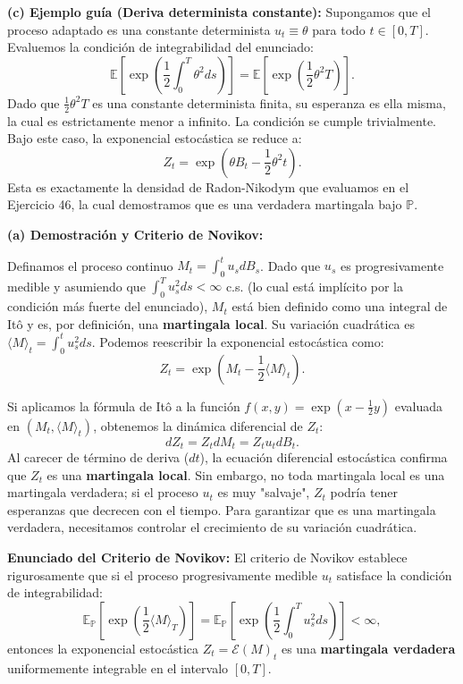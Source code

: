 \documentclass[11pt, letterpaper]{article}
\begin{document}
\begin{solucion}
    \textbf{(c) Ejemplo guía (Deriva determinista constante):}
    Supongamos que el proceso adaptado es una constante determinista $u_t \equiv \theta$ para todo $t \in [0, T]$. 
    Evaluemos la condición de integrabilidad del enunciado:
    \[ \mathbb{E}\left[\exp\left(\frac{1}{2}\int_0^T \theta^2 ds\right)\right] = \mathbb{E}\left[\exp\left(\frac{1}{2}\theta^2 T\right)\right]. \]
    Dado que $\frac{1}{2}\theta^2 T$ es una constante determinista finita, su esperanza es ella misma, la cual es estrictamente menor a infinito. La condición se cumple trivialmente.
    Bajo este caso, la exponencial estocástica se reduce a:
    \[ Z_t = \exp\left( \theta B_t - \frac{1}{2}\theta^2 t \right). \]
    Esta es exactamente la densidad de Radon-Nikodym que evaluamos en el Ejercicio 46, la cual demostramos que es una verdadera martingala bajo $\mathbb{P}$.

    \vspace{3mm}
    \textbf{(a) Demostración y Criterio de Novikov:}

    Definamos el proceso continuo $M_t = \int_0^t u_s dB_s$. Dado que $u_s$ es progresivamente medible y asumiendo que $\int_0^T u_s^2 ds < \infty$ c.s. (lo cual está implícito por la condición más fuerte del enunciado), $M_t$ está bien definido como una integral de Itô y es, por definición, una \textbf{martingala local}.
    Su variación cuadrática es $\langle M \rangle_t = \int_0^t u_s^2 ds$.
    Podemos reescribir la exponencial estocástica como:
    \[ Z_t = \exp\left( M_t - \frac{1}{2}\langle M \rangle_t \right). \]
    
    Si aplicamos la fórmula de Itô a la función $f(x, y) = \exp(x - \frac{1}{2}y)$ evaluada en $(M_t, \langle M \rangle_t)$, obtenemos la dinámica diferencial de $Z_t$:
    \[ dZ_t = Z_t dM_t = Z_t u_t dB_t. \]
    Al carecer de término de deriva ($dt$), la ecuación diferencial estocástica confirma que $Z_t$ es una \textbf{martingala local}. Sin embargo, no toda martingala local es una martingala verdadera; si el proceso $u_t$ es muy "salvaje", $Z_t$ podría tener esperanzas que decrecen con el tiempo. Para garantizar que es una martingala verdadera, necesitamos controlar el crecimiento de su variación cuadrática.

    \textbf{Enunciado del Criterio de Novikov:} 
    El criterio de Novikov establece rigurosamente que si el proceso progresivamente medible $u_t$ satisface la condición de integrabilidad:
    \[ \mathbb{E}_{\mathbb{P}}\left[ \exp\left( \frac{1}{2} \langle M \rangle_T \right) \right] = \mathbb{E}_{\mathbb{P}}\left[ \exp\left( \frac{1}{2} \int_0^T u_s^2 ds \right) \right] < \infty, \]
    entonces la exponencial estocástica $Z_t = \mathcal{E}(M)_t$ es una \textbf{martingala verdadera} uniformemente integrable en el intervalo $[0, T]$. 
    

\end{solucion}
\end{document}
